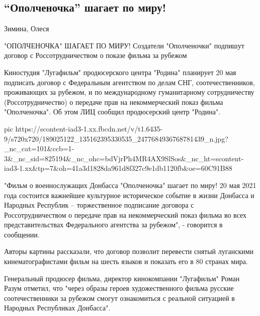  
 
 
 
 
\subsection{\enquote{Ополченочка} шагает по миру!}
\label{sec:20_05_2021.fb.respublikalnr.2.opolchenochka_film}

Зимина, Олеся

"ОПОЛЧЕНОЧКА" ШАГАЕТ ПО МИРУ! Создатели "Ополченочки" подпишут договор с Россотрудничеством о показе фильма за рубежом

Киностудия "Лугафильм" продюсерского центра "Родина" планирует 20 мая подписать
договор с Федеральным агентством по делам СНГ, соотечественников, проживающих
за рубежом, и по международному гуманитарному сотрудничеству
(Россотрудничество) о передаче прав на некоммерческий показ фильма
"Ополченочка". Об этом ЛИЦ сообщил продюсерский центр "Родина".

\ifcmt
  pic https://scontent-iad3-1.xx.fbcdn.net/v/t1.6435-9/s720x720/189025122_135162395330535_2477684936768781439_n.jpg?_nc_cat=101&ccb=1-3&_nc_sid=825194&_nc_ohc=bdVjrPh4MR4AX9SlSos&_nc_ht=scontent-iad3-1.xx&tp=7&oh=41a3d1828da961d8f327c9e1db1120fb&oe=60C91B88
\fi

"Фильм о военнослужащих Донбасса "Ополченочка" шагает по миру! 20 мая 2021 года
состоится важнейшее культурное историческое событие в жизни Донбасса и Народных
Республик – торжественное подписание договора с Россотрудничеством о передаче
прав на некоммерческий показ фильма во всех представительствах Федерального
агентства за рубежом", - говорится в сообщении.

Авторы картины рассказали, что договор позволит перевести снятый луганскими
кинематографистами фильм на шесть языков и показать его в 80 странах мира.

Генеральный продюсер фильма, директор кинокомпании "Лугафильм" Роман Разум
отметил, что "через образы героев художественного фильма русские
соотечественники за рубежом смогут ознакомиться с реальной ситуацией в Народных
Республиках Донбасса".

